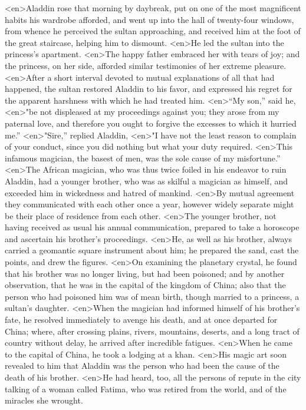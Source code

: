 <en>Aladdin rose that morning by daybreak, put on one of the most magnificent habits his wardrobe afforded, and went up into the hall of twenty-four windows, from whence he perceived the sultan approaching, and received him at the foot of the great staircase, helping him to dismount.
<en>He led the sultan into the princess’s apartment.
<en>The happy father embraced her with tears of joy; and the princess, on her side, afforded similar testimonies of her extreme pleasure.
<en>After a short interval devoted to mutual explanations of all that had happened, the sultan restored Aladdin to his favor, and expressed his regret for the apparent harshness with which he had treated him.
<en>“My son,” said he,
<en>"be not displeased at my proceedings against you; they arose from my paternal love, and therefore you ought to forgive the excesses to which it hurried me.”
<en>"Sire,” replied Aladdin,
<en>"I have not the least reason to complain of your conduct, since you did nothing but what your duty required.
<en>This infamous magician, the basest of men, was the sole cause of my misfortune.”
<en>The African magician, who was thus twice foiled in his endeavor to ruin Aladdin, had a younger brother, who was as skilful a magician as himself, and exceeded him in wickedness and hatred of mankind.
<en>By mutual agreement they communicated with each other once a year, however widely separate might be their place of residence from each other.
<en>The younger brother, not having received as usual his annual communication, prepared to take a horoscope and ascertain his brother’s proceedings.
<en>He, as well as his brother, always carried a geomantic square instrument about him; he prepared the sand, cast the points, and drew the figures.
<en>On examining the planetary crystal, he found that his brother was no longer living, but had been poisoned; and by another observation, that he was in the capital of the kingdom of China; also that the person who had poisoned him was of mean birth, though married to a princess, a sultan’s daughter.
<en>When the magician had informed himself of his brother’s fate, he resolved immediately to avenge his death, and at once departed for China; where, after crossing plains, rivers, mountains, deserts, and a long tract of country without delay, he arrived after incredible fatigues.
<en>When he came to the capital of China, he took a lodging at a khan.
<en>His magic art soon revealed to him that Aladdin was the person who had been the cause of the death of his brother.
<en>He had heard, too, all the persons of repute in the city talking of a woman called Fatima, who was retired from the world, and of the miracles she wrought.
